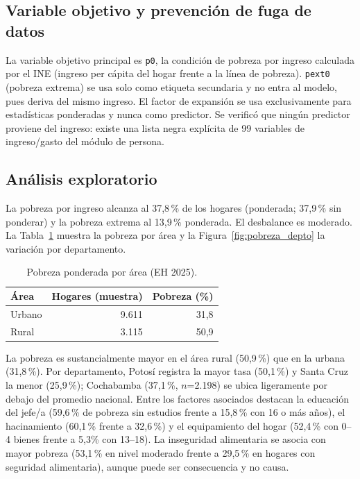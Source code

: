 \subsection{Variable objetivo y prevención de fuga de datos}
La variable objetivo principal es \texttt{p0}, la condición de pobreza por ingreso calculada por el INE (ingreso per cápita del hogar frente a la línea de pobreza). \texttt{pext0} (pobreza extrema) se usa solo como etiqueta secundaria y no entra al modelo, pues deriva del mismo ingreso. El factor de expansión se usa exclusivamente para estadísticas ponderadas y nunca como predictor. Se verificó que ningún predictor proviene del ingreso: existe una lista negra explícita de 99 variables de ingreso/gasto del módulo de persona.

\subsection{Análisis exploratorio}
La pobreza por ingreso alcanza al 37,8\,\% de los hogares (ponderada; 37,9\,\% sin ponderar) y la pobreza extrema al 13,9\,\% ponderada. El desbalance es moderado. La Tabla~\ref{tab:pobreza_area} muestra la pobreza por área y la Figura~\ref{fig:pobreza_depto} la variación por departamento.

\begin{table}[ht]\centering\caption{Pobreza ponderada por área (EH 2025).}\label{tab:pobreza_area}
\begin{tabular}{lrr}\toprule Área & Hogares (muestra) & Pobreza (\%) \\\midrule
Urbano & 9.611 & 31,8 \\
Rural & 3.115 & 50,9 \\\bottomrule\end{tabular}\end{table}

La pobreza es sustancialmente mayor en el área rural (50,9\,\%) que en la urbana (31,8\,\%). Por departamento, Potosí registra la mayor tasa (50,1\,\%) y Santa Cruz la menor (25,9\,\%); Cochabamba (37,1\,\%, $n$=2.198) se ubica ligeramente por debajo del promedio nacional. Entre los factores asociados destacan la educación del jefe/a (59,6\,\% de pobreza sin estudios frente a 15,8\,\% con 16 o más años), el hacinamiento (60,1\,\% frente a 32,6\,\%) y el equipamiento del hogar (52,4\,\% con 0--4 bienes frente a 5,3\% con 13--18). La inseguridad alimentaria se asocia con mayor pobreza (53,1\,\% en nivel moderado frente a 29,5\,\% en hogares con seguridad alimentaria), aunque puede ser consecuencia y no causa.

